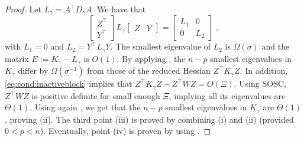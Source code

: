 \begin{proof}
  Let $L_\gamma = A^\top D_\gamma A$.
  We have that
  \begin{equation}
    \begin{bmatrix}
      Z^\top \\ Y^\top
    \end{bmatrix}
    L_\gamma \begin{bmatrix}Z & Y \end{bmatrix}
    = \begin{bmatrix}
      L_1 & 0 \\
      0 & L_2
    \end{bmatrix} \; ,
  \end{equation}
  with $L_1 = 0$ and $L_2 = Y^\top L_\gamma Y$.
  The smallest eigenvalue of $L_2$ is $\Omega(\underline{\sigma})$
  and the matrix $E := K_\gamma - L_\gamma$ is $O(1)$.
  By applying \cite[Theorem 3.1, (ii)]{wright1998ill},
  the $n - p$ smallest eigenvalues in $K_\gamma$ differ by
  $\Omega(\underline{\sigma}^{-1})$ from those of the reduced Hessian $Z^\top K_\gamma Z$.
  In addition, \eqref{eq:cond:inactiveblock} implies
  that $Z^\top K_\gamma Z - Z^\top W Z = O(\Xi)$. Using SOSC,
  $Z^\top W Z$ is positive definite for small enough $\Xi$, implying
  all its eigenvalues are $\Theta(1)$. Using again \cite[Lemma 3.1]{wright1998ill},
  we get that the $n-p$ smallest eigenvalues in $K_\gamma$ are $\Theta(1)$,
  proving (ii). The third point (iii) is proved by combining
  (i) and (ii) (provided $0 < p < n$).
  Eventually, point (iv) is proven by using \cite[Theorem 3.1 (i)]{wright1998ill}.
\end{proof}

